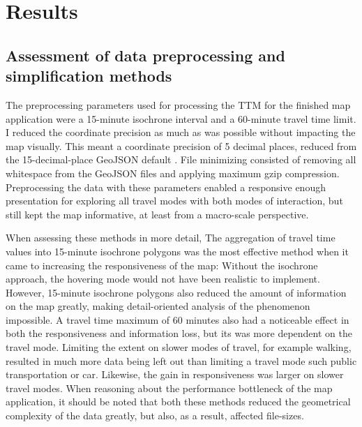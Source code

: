 \section{Results}

\subsection{Assessment of data preprocessing and simplification methods}

The preprocessing parameters used for
processing the TTM for the finished map application were
a 15-minute isochrone interval and a 60-minute travel time limit.
I reduced the coordinate precision as much as
was possible without impacting the map visually.
This meant a coordinate precision of 5 decimal places,
reduced from the 15-decimal-place GeoJSON default \parencite{geojsonspec}.
File minimizing consisted of removing all whitespace from the GeoJSON files
and applying maximum gzip compression.
Preprocessing the data with these parameters
enabled a responsive enough presentation for exploring all travel modes
with both modes of interaction,
but still kept the map informative, at least from a macro-scale perspective.

When assessing these methods in more detail,
The aggregation of travel time values into 15-minute isochrone polygons was the most 
effective method when it came to increasing the responsiveness of the map:
Without the isochrone approach,
the hovering mode would not have been realistic to implement.
However, 15-minute isochrone polygons also reduced the amount of information on the map greatly,
making detail-oriented analysis of the phenomenon impossible.
A travel time maximum of 60 minutes also had a noticeable effect
in both the responsiveness and information loss,
but its was more dependent on the travel mode.
Limiting the extent on slower modes of travel, for example walking,
resulted in much more data being left out than limiting a travel mode such public transportation or car.
Likewise, the gain in responsiveness was larger on slower travel modes.
When reasoning about the performance bottleneck of the map application,
it should be noted that both these methods reduced the geometrical complexity of the data greatly,
but also, as a result, affected file-sizes.

